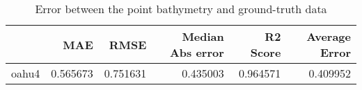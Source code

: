 \begin{table}[h!]
\centering
\caption{Error between the point bathymetry and ground-truth data}
\label{tab:oahu4_lidar_error}
\begin{tabular}{lrrrrr}
\toprule
 & MAE & RMSE & Median Abs error & R2 Score & Average Error \\
\midrule
oahu4 & 0.565673 & 0.751631 & 0.435003 & 0.964571 & 0.409952 \\
\bottomrule
\end{tabular}
\end{table}
